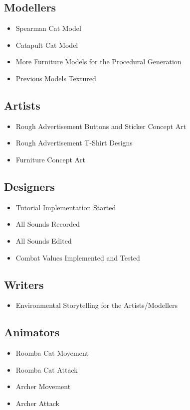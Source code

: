 \documentclass{article}
\begin{document}
\subsection{Modellers}
\begin{itemize}
    \item Spearman Cat Model
    \item Catapult Cat Model
    \item More Furniture Models for the Procedural Generation
    \item Previous Models Textured
\end{itemize}

\subsection{Artists}
\begin{itemize}
    \item Rough Advertisement Buttons and Sticker Concept Art
    \item Rough Advertisement T-Shirt Designs
    \item Furniture Concept Art
\end{itemize}

\subsection{Designers}
\begin{itemize}
    \item Tutorial Implementation Started
    \item All Sounds Recorded
    \item All Sounds Edited
    \item Combat Values Implemented and Tested
\end{itemize}

\subsection{Writers}
\begin{itemize}
    \item Environmental Storytelling for the Artists/Modellers
\end{itemize}

\subsection{Animators}
\begin{itemize}
    \item Roomba Cat Movement
    \item Roomba Cat Attack
    \item Archer Movement
    \item Archer Attack
\end{itemize}
\end{document}
